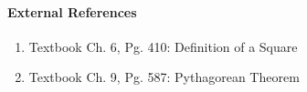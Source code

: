 \documentclass[letterpaper,12pt,twoside]{report}
\begin{document}
	\paragraph{External References}
	
	\begin{enumerate}
		\item Textbook Ch. 6, Pg. 410: Definition of a Square
		\item Textbook Ch. 9, Pg. 587: Pythagorean Theorem
	\end{enumerate}
	
\end{document}
